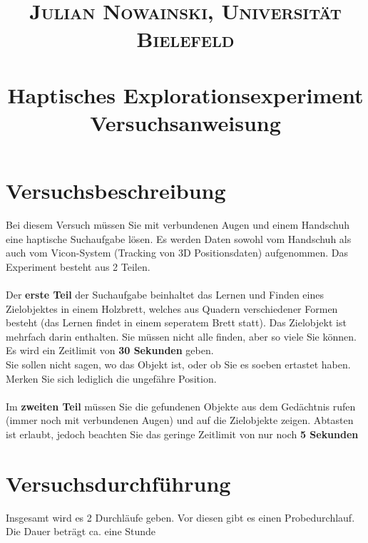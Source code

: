 \documentclass[paper=a4, fontsize=11pt]{scrartcl} %
\title{	
\normalfont \normalsize 
\textsc{Julian Nowainski, Universität Bielefeld} \\ [5pt] %
\horrule{0.5pt} \\[0.4cm] %
\huge Haptisches Explorationsexperiment \\ %
\large Versuchsanweisung
\horrule{2pt} \\[0.5cm] %
\date{\vspace{-10ex}} %
}
\numberwithin{equation}{section} %
\numberwithin{figure}{section} %
\numberwithin{table}{section} %
\begin{document}
\maketitle %


\section{Versuchsbeschreibung}
Bei diesem Versuch müssen Sie mit verbundenen Augen und einem Handschuh eine haptische Suchaufgabe lösen. Es werden Daten sowohl vom Handschuh als auch vom Vicon-System (Tracking von 3D Positionsdaten) aufgenommen. Das Experiment besteht aus 2 Teilen. \\\\
Der \textbf{erste Teil} der Suchaufgabe beinhaltet das Lernen und Finden eines Zielobjektes in einem Holzbrett, welches aus Quadern verschiedener Formen besteht (das Lernen findet in einem seperatem Brett statt). Das Zielobjekt ist mehrfach darin enthalten. Sie müssen nicht alle finden, aber so viele Sie können. Es wird ein Zeitlimit von \textbf{30 Sekunden} geben. \\
Sie sollen nicht sagen, wo das Objekt ist, oder ob Sie es soeben ertastet haben. Merken Sie sich lediglich die ungefähre Position.\\\\
Im \textbf{zweiten Teil} müssen Sie die gefundenen Objekte aus dem Gedächtnis rufen (immer noch mit verbundenen Augen) und auf die Zielobjekte zeigen. Abtasten ist erlaubt, jedoch beachten Sie das geringe Zeitlimit von nur noch \textbf{5 Sekunden}



\section{Versuchsdurchführung}
Insgesamt wird es 2 Durchläufe geben. Vor diesen gibt es einen Probedurchlauf. Die Dauer beträgt ca. eine Stunde
\end{document}
